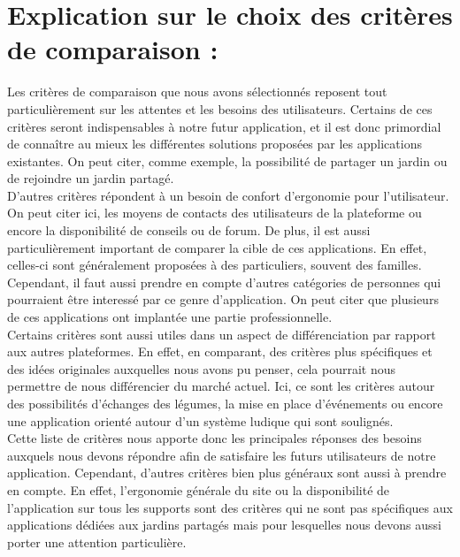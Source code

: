 \documentclass{report}
\begin{document}
\section{Explication sur le choix des critères de comparaison :}
Les critères de comparaison que nous avons sélectionnés reposent tout particulièrement sur les attentes et les besoins des utilisateurs. Certains de ces critères seront indispensables à notre futur application, et il est donc primordial de connaître au mieux les différentes solutions proposées par les applications existantes. On peut citer, comme exemple, la possibilité de partager un jardin ou de rejoindre un jardin partagé. 
\newline
\\
D’autres critères répondent à un besoin de confort d'ergonomie pour l’utilisateur. On peut citer ici, les moyens de contacts des utilisateurs de la plateforme ou encore la disponibilité de conseils ou de forum. De plus, il est aussi particulièrement important de comparer la cible de ces applications. En effet, celles-ci sont généralement proposées à des particuliers, souvent des familles. Cependant, il faut aussi prendre en compte d'autres catégories de personnes qui pourraient être interessé par ce genre d'application. On peut citer que plusieurs de ces applications ont implantée une partie professionnelle. 
\newline
\\
Certains critères sont aussi utiles dans un aspect de différenciation par rapport aux autres plateformes. En effet, en comparant, des critères plus spécifiques et des idées originales auxquelles nous avons pu penser, cela pourrait nous permettre de nous différencier du marché actuel. Ici, ce sont les critères autour des possibilités d’échanges des légumes, la mise en place d'événements ou encore une application orienté autour d'un système ludique qui sont soulignés. 
\newline
\\
Cette liste de critères nous apporte donc les principales réponses des besoins auxquels nous devons répondre afin de satisfaire les futurs utilisateurs de notre application. Cependant, d’autres critères bien plus généraux sont aussi à prendre en compte. En effet, l’ergonomie générale du site ou la disponibilité de l’application sur tous les supports sont des critères qui ne sont pas spécifiques aux applications dédiées aux jardins partagés mais pour lesquelles nous devons aussi porter une attention particulière. \\
\newpage
\end{document}
